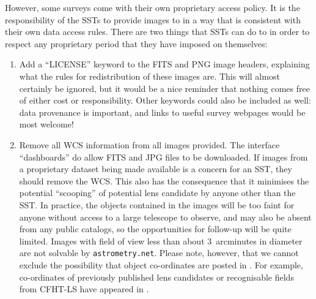 \documentclass[a4paper]{article}
\begin{document}
However, some surveys come with their own proprietary access policy. It is the responsibility
of the SSTs to provide images to \sw in a way that is consistent
with their own data access rules. There are two things that SSTs can
do to in order to respect any proprietary period that they have imposed on
themselves:
\begin{enumerate}

\item Add a ``LICENSE'' keyword to the FITS and PNG image headers, explaining
what the rules for redistribution of these images are. This will almost
certainly be ignored, but it would be a nice reminder that nothing comes free
of either cost or responsibility. Other keywords could also be included as
well: data provenance is important, and links to useful survey webpages would
be most welcome!

\item Remove all WCS information from all images provided. The \sw interface ``dashboards'' do allow FITS and JPG files to be downloaded. If images from a proprietary dataset being made available is a concern for an SST, they should remove the WCS. This also has the consequence that it minimises the potential ``scooping'' of potential lens candidate by anyone other than the SST. 
In practice, the objects contained in the \sw images will be too faint
for anyone without access to a large telescope to observe, and may also be
absent from any public catalogs, so the opportunities for follow-up will be
quite limited. Images
with field of view less than about 3~arcminutes in diameter are not solvable
by \texttt{astrometry.net}. Please note, however, that we cannot exclude the possibility that object co-ordinates are posted in \Talk. For example, co-ordinates of previously published lens candidates or recognisable fields from CFHT-LS have appeared in \Talk.



\end{enumerate}
\end{document}
